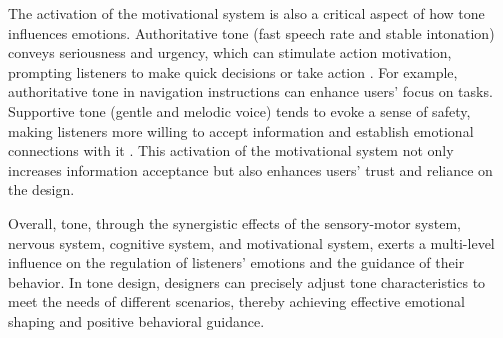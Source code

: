 The activation of the motivational system is also a critical aspect of how tone influences emotions. Authoritative tone (fast speech rate and stable intonation) conveys seriousness and urgency, which can stimulate action motivation, prompting listeners to make quick decisions or take action \cite{fogg2009behavior}. For example, authoritative tone in navigation instructions can enhance users’ focus on tasks. Supportive tone (gentle and melodic voice) tends to evoke a sense of safety, making listeners more willing to accept information and establish emotional connections with it \cite{weinstein2018you}. This activation of the motivational system not only increases information acceptance but also enhances users’ trust and reliance on the design.

Overall, tone, through the synergistic effects of the sensory-motor system, nervous system, cognitive system, and motivational system, exerts a multi-level influence on the regulation of listeners’ emotions and the guidance of their behavior. In tone design, designers can precisely adjust tone characteristics to meet the needs of different scenarios, thereby achieving effective emotional shaping and positive behavioral guidance.


